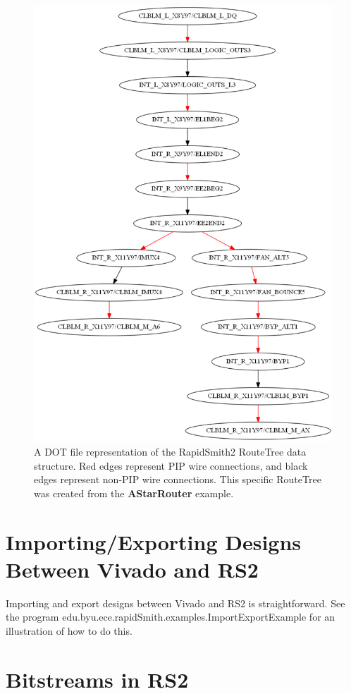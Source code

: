 \documentclass[12pt]{article}
\newcommand{\pgm}[1]{{\textbf{#1}}}
\begin{document}
\begin{figure}[H]
\centering
\includegraphics[width=0.8\columnwidth]{routeTree}
\caption{A DOT file representation of the RapidSmith2 RouteTree data structure.
Red edges represent PIP wire connections, and black edges represent non-PIP
wire connections. This specific RouteTree was created from the \pgm{AStarRouter}
example.}
\label{fig:routeTree}
\end{figure}


\section{Importing/Exporting Designs Between Vivado and RS2}

Importing and export designs between Vivado and RS2 is straightforward.  See the
program edu.byu.ece.rapidSmith.examples.ImportExportExample for an illustration
of how to do this.

\section{Bitstreams in RS2}
\end{document}
